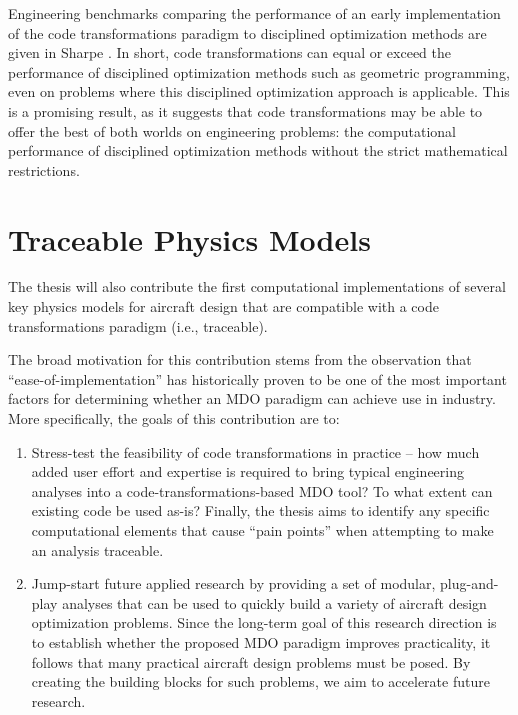 \documentclass[12pt,vi,oneside,table]{report}
\begin{document}
    Engineering benchmarks comparing the performance of an early implementation of the code transformations paradigm to disciplined optimization methods are given in Sharpe \cite{sharpe_aerosandbox_2021}. In short, code transformations can equal or exceed the performance of disciplined optimization methods such as geometric programming, even on problems where this disciplined optimization approach is applicable. This is a promising result, as it suggests that code transformations may be able to offer the best of both worlds on engineering problems: the computational performance of disciplined optimization methods without the strict mathematical restrictions.

    \section{Traceable Physics Models}
    \label{sec:physics_models}

    The thesis will also contribute the first computational implementations of several key physics models for aircraft design that are compatible with a code transformations paradigm (i.e., traceable).

    The broad motivation for this contribution stems from the observation that ``ease-of-implementation'' has historically proven to be one of the most important factors for determining whether an MDO paradigm can achieve use in industry. More specifically, the goals of this contribution are to:

    \begin{enumerate}
        \item Stress-test the feasibility of code transformations in practice -- how much added user effort and expertise is required to bring typical engineering analyses into a code-transformations-based MDO tool? To what extent can existing code be used as-is? Finally, the thesis aims to identify any specific computational elements that cause ``pain points'' when attempting to make an analysis traceable.
        \item Jump-start future applied research by providing a set of modular, plug-and-play analyses that can be used to quickly build a variety of aircraft design optimization problems. Since the long-term goal of this research direction is to establish whether the proposed MDO paradigm improves practicality, it follows that many practical aircraft design problems must be posed. By creating the building blocks for such problems, we aim to accelerate future research.
    \end{enumerate}
\end{document}
